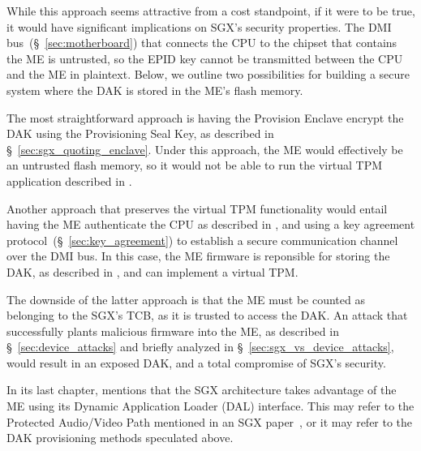 While this approach seems attractive from a cost standpoint, if it were to be
true, it would have significant implications on SGX's security properties. The
DMI bus~(\S~\ref{sec:motherboard}) that connects the CPU to the chipset that
contains the ME is untrusted, so the EPID key cannot be transmitted between the
CPU and the ME in plaintext. Below, we outline two possibilities for building a
secure system where the DAK is stored in the ME's flash memory.

The most straightforward approach is having the Provision Enclave encrypt the
DAK using the Provisioning Seal Key, as described in
\S~\ref{sec:sgx_quoting_enclave}. Under this approach, the ME would effectively
be an untrusted flash memory, so it would not be able to run the virtual TPM
application described in \cite{ruan2014intelme}.

Another approach that preserves the virtual TPM functionality would entail
having the ME authenticate the CPU as described in \cite{costan2011spchip}, and
using a key agreement protocol~(\S~\ref{sec:key_agreement}) to establish a
secure communication channel over the DMI bus. In this case, the ME firmware is
reponsible for storing the DAK, as described in \cite{ruan2014intelme}, and
can implement a virtual TPM.

The downside of the latter approach is that the ME must be counted as belonging
to the SGX's TCB, as it is trusted to access the DAK. An attack that
successfully plants malicious firmware into the ME, as described in
\S~\ref{sec:device_attacks} and briefly analyzed in
\S~\ref{sec:sgx_vs_device_attacks}, would result in an exposed DAK, and a total
compromise of SGX's security.


In its last chapter, \cite{ruan2014intelme} mentions that the SGX architecture
takes advantage of the ME using its Dynamic Application Loader (DAL) interface.
This may refer to the Protected Audio/Video Path mentioned in an SGX
paper~\cite{hoekstra2013sgx}, or it may refer to the DAK provisioning methods
speculated above.
